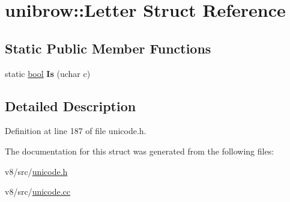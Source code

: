 \hypertarget{structunibrow_1_1Letter}{}\section{unibrow\+:\+:Letter Struct Reference}
\label{structunibrow_1_1Letter}
\subsection*{Static Public Member Functions}
\begin{DoxyCompactItemize}
\item 
\mbox{\label{structunibrow_1_1Letter_a102f3b1d0b14704846a16f95485c5208}} 
static \mbox{\hyperlink{classbool}{bool}} {\bfseries Is} (uchar c)
\end{DoxyCompactItemize}


\subsection{Detailed Description}


Definition at line 187 of file unicode.\+h.



The documentation for this struct was generated from the following files\+:\begin{DoxyCompactItemize}
\item 
v8/src/\mbox{\hyperlink{unicode_8h}{unicode.\+h}}\item 
v8/src/\mbox{\hyperlink{unicode_8cc}{unicode.\+cc}}\end{DoxyCompactItemize}
